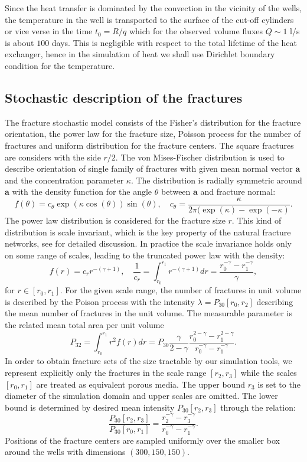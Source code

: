 \documentclass{article}
\newcommand{\eq}[1]{\begin{equation}#1\end{equation}}
\newcommand{\vc}[1]{\boldsymbol{#1}}
\begin{document}
Since the heat transfer is dominated by the convection in the vicinity of the wells, the temperature in the well is transported to the surface of the cut-off cylinders or vice verse in the time $t_0 = R/q$ which for the observed volume fluxes $Q\sim 1$ l/s is about $100$ days. This is negligible with respect to the total lifetime of the heat exchanger, hence in the simulation of heat we shall use Dirichlet boundary condition for the temperature.

\subsection{Stochastic description of the fractures}
The fracture stochastic model consists of the Fisher's distribution for the fracture orientation, the power law for the fracture size, Poisson process for the number of fractures and uniform distribution for the fracture centers. The square fractures are considers with the side $r/2$. 
The von Mises-Fischer distribution \cite{Fisher1993} is used to describe orientation of single family of fractures with given mean normal vector $\vc a$ and the concentration parameter $\kappa$. The distribution is radially symmetric around $\vc a$ with the density function for the angle $\theta$ between $\vc a$ and fracture normal:
\[
 f(\theta) = c_\theta \exp(\kappa \cos(\theta)) \sin(\theta),
 \quad
 c_\theta = \frac{\kappa}{2\pi(\exp(\kappa) - \exp(-\kappa)}.
\] 
The power law distribution is considered for the fracture size $r$.
This kind of distribution is scale invariant, which is the key property of the natural fracture networks, see \cite{Bonnet2001} for detailed discussion. In practice the scale invariance holds only on some range of scales, leading to the truncated power law with the density:
\begin{equation}
    \label{eq:pow_law}
    f(r) = c_r r^{-(\gamma+1)},\quad 
    \frac{1}{c_r}=\int_{r_0}^{r_1} r^{-(\gamma+1)} dr = 
    \frac{r_0^{-\gamma} - r_1^{-\gamma}}{\gamma},
\end{equation}
for $r \in [r_0, r_1]$. 
For the given scale range, the number of fractures in unit volume is described by the Poison process with the intensity $\lambda=P_{30}[r_0, r_2]$ describing the mean number of fractures in the unit volume. The measurable parameter is the related mean total area per unit volume 
\[
P_{32} =
   \int_{r_0}^{r_1} r^2 f(r) dr =
    P_{30} \frac{\gamma}{2-\gamma}    \frac{r_0^{2-\gamma} - r_1^{2-\gamma}}
    {r_0^{-\gamma} - r_1^{-\gamma}}.
\]
In order to obtain fracture sets of the size tractable by our simulation tools, we represent explicitly only the fractures in the scale range $[r_2, r_3]$ while the scales $[r_0, r_1]$ are treated as equivalent porous media. The upper bound $r_3$ is set to the diameter of the simulation domain and upper scales are omitted. The lower bound is determined by desired mean intensity $P_{30}[r_2, r_3]$ through the relation:
\eq{
    \label{eq:pl_rescale}
    \frac{P_{30}[r_2, r_3]}{P_{30}[r_0, r_1]} 
    =
    \frac{r_2^{-\gamma} - r_3^{-\gamma}}
    {r_0^{-\gamma} - r_1^{-\gamma}}.
}
Positions of the fracture centers are sampled uniformly over the smaller box around the wells with dimensions $(300, 150, 150)$. 
\end{document}
